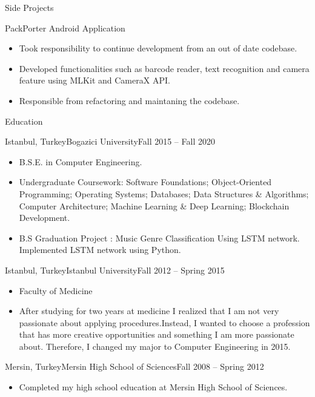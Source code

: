 \documentclass[]{mcdowellcv}
\begin{document}
    \vspace{\baselineskip}
    
    \begin{cvsection}{Side Projects}
		\begin{cvsubsection}{PackPorter Android Application}{}{}
			\begin{itemize}
				\item Took responsibility to continue development from an out of date codebase.
				\item Developed functionalities such as barcode reader, text recognition and camera feature using MLKit and CameraX API.
				\item Responsible from refactoring and maintaning the codebase.
			\end{itemize}
		\end{cvsubsection}
	\end{cvsection}
	
	\begin{cvsection}{Education}
		\begin{cvsubsection}{Istanbul, Turkey}{Bogazici University}{Fall 2015 -- Fall 2020}
			\begin{itemize}
				\item B.S.E. in Computer Engineering.
				\item Undergraduate Coursework: Software Foundations; Object-Oriented Programming; Operating Systems; Databases; Data Structures \& Algorithms; Computer Architecture; Machine Learning \& Deep Learning; \linebreak Blockchain Development.
				\item B.S Graduation Project : Music Genre Classification Using LSTM network. Implemented LSTM network using Python.
			\end{itemize}
		\end{cvsubsection}
		
		\begin{cvsubsection}{Istanbul, Turkey}{Istanbul University}{Fall 2012 -- Spring 2015}
			\begin{itemize}
				\item Faculty of Medicine
				\item After studying for two years at medicine I realized that I am not very passionate about applying procedures.\linebreak Instead, I wanted to choose a profession that has more creative opportunities and something I am more passionate about. Therefore, I changed my major to Computer Engineering in 2015.
			\end{itemize}
		\end{cvsubsection}
		
		\begin{cvsubsection}{Mersin, Turkey}{Mersin High School of Sciences}{Fall 2008 -- Spring 2012}
			\begin{itemize}
				\item Completed my high school education at Mersin High School of Sciences.
			\end{itemize}
		\end{cvsubsection}
	\end{cvsection}
	
\end{document}
